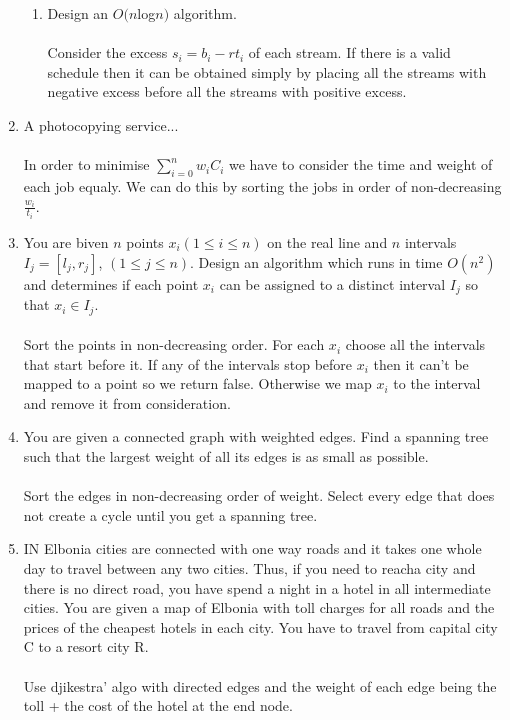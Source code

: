 \documentclass[a4paper]{article}
\begin{document}
\begin{enumerate}
\begin{enumerate}
						\item Design an $O(n$log$n)$ algorithm. \\ \\
								Consider the excess $s_i = b_i - rt_i$ of each stream. If there is a valid schedule then it can be obtained simply by placing all the streams with negative excess before all the streams with positive excess.
				\end{enumerate}
		\item A photocopying service... \\ \\
				In order to minimise $\sum_{i=0}^{n} w_iC_i$ we have to consider the time and weight of each job equaly. We can do this by sorting the jobs in order of non-decreasing $\frac{w_i}{t_i}$.
		\item You are biven $n$ points $x_i (1 \leq i \leq n)$ on the real line and $n$ intervals $I_j = [l_j, r_j]$, $(1 \leq j \leq n)$. Design an algorithm which runs in time $O(n^2)$ and determines if each point $x_i$ can be assigned to a distinct interval $I_j$ so that $x_i \in I_j$. \\ \\
				Sort the points in non-decreasing order. For each $x_i$ choose all the intervals that start before it. If any of the intervals stop before $x_i$ then it can't be mapped to a point so we return false. Otherwise we map $x_i$ to the interval and remove it from consideration.
		\item You are given a connected graph with weighted edges. Find a spanning tree such that the largest weight of all its edges is as small as possible. \\ \\
				Sort the edges in non-decreasing order of weight. Select every edge that does not create a cycle until you get a spanning tree.
		\item IN Elbonia cities are connected with one way roads and it takes one whole day to travel between any two cities. Thus, if you need to reacha city and there is no direct road, you have spend a night in a hotel in all intermediate cities. You are given a map of Elbonia with toll charges for all roads and the prices of the cheapest hotels in each city. You have to travel from capital city C to a resort city R. \\ \\
				Use djikestra' algo with directed edges and the weight of each edge being the toll + the cost of the hotel at the end node.
				

\end{enumerate}
\end{document}
